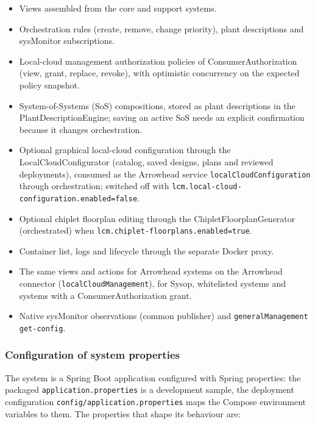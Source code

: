 \documentclass[a4paper]{arrowhead}
\begin{document}
\begin{itemize}
  \item Views assembled from the core and support systems.
  \item Orchestration rules (create, remove, change priority), plant descriptions and sysMonitor subscriptions.
  \item Local-cloud management authorization policies of ConsumerAuthorization (view, grant, replace, revoke), with optimistic concurrency on the expected policy snapshot.
  \item System-of-Systems (SoS) compositions, stored as plant descriptions in the Plant\allowbreak{}Description\allowbreak{}Engine; saving an active SoS needs an explicit confirmation because it changes orchestration.
  \item Optional graphical local-cloud configuration through the Local\allowbreak{}Cloud\allowbreak{}Configurator (catalog, saved designs, plans and reviewed deployments), consumed as the Arrowhead service \texttt{local\allowbreak{}Cloud\allowbreak{}Configuration} through orchestration; switched off with \texttt{lcm.\allowbreak{}local-\allowbreak{}cloud-\allowbreak{}configuration.\allowbreak{}enabled=\allowbreak{}false}.
  \item Optional chiplet floorplan editing through the Chiplet\allowbreak{}Floorplan\allowbreak{}Generator (orchestrated) when \texttt{lcm.\allowbreak{}chiplet-\allowbreak{}floorplans.\allowbreak{}enabled=\allowbreak{}true}.
  \item Container list, logs and lifecycle through the separate Docker proxy.
  \item The same views and actions for Arrowhead systems on the Arrowhead connector (\texttt{local\allowbreak{}Cloud\allowbreak{}Management}), for Sysop, whitelisted systems and systems with a ConsumerAuthorization grant.
  \item Native sysMonitor observations (common publisher) and \texttt{general\allowbreak{}Management} \texttt{get-\allowbreak{}config}.
\end{itemize}

\subsubsection{Configuration of system properties}

The system is a Spring Boot application configured with Spring properties: the packaged \texttt{application.\allowbreak{}properties} is a development sample, the deployment configuration \texttt{config/\allowbreak{}application.\allowbreak{}properties} maps the Compose environment variables to them. The properties that shape its behaviour are:
\end{document}
